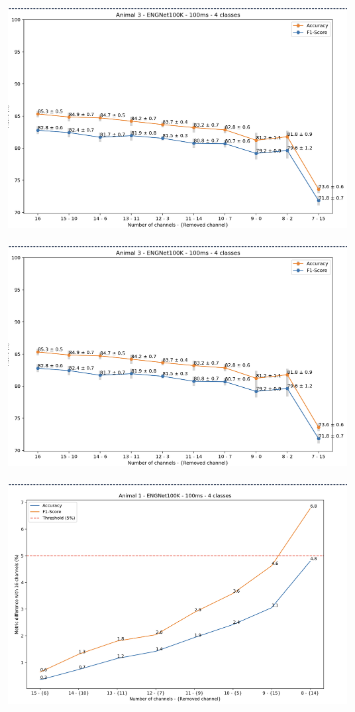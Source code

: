 \documentclass{Configuration_Files/PoliMi3i_thesis}
\begin{document}
\begin{figure}[h!]
    \centering
    \includegraphics[width=0.8\textwidth]{Results Matteo/figure4}
    \label{fig:figure1}
\end{figure}

\begin{figure}[h!]
    \centering
    \includegraphics[width=0.8\textwidth]{Results Matteo/figure5}
    \label{fig:figure1}
\end{figure}

\begin{figure}[h!]
    \centering
    \includegraphics[width=0.8\textwidth]{Results Matteo/figure6}
    \label{fig:figure1}
\end{figure}
\end{document}
